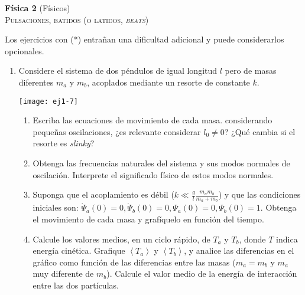 \documentclass[11pt,spanish,a4paper]{article}
\begin{document}
\begin{center}
\textbf{Física 2} (Físicos) \hfill {}\\
	\textsc{\LARGE Pulsaciones, batidos (o latidos, \emph{beats})}
\end{center}

Los ejercicios con (*) entrañan una dificultad adicional y puede considerarlos opcionales.


\begin{enumerate}


\item \label{pendacop}
\begin{minipage}[t][2.2cm]{0.75\textwidth}
Considere el sistema de dos péndulos de igual longitud $l$ pero de masas diferentes $m_{a}$ y $m_{b}$, acoplados mediante un resorte
de constante $k$.
\end{minipage}
\begin{minipage}[c][2cm][t]{0.2\textwidth}
  \texttt{[image: ej1-7]}
\end{minipage}
\begin{enumerate}
	\item Escriba las ecuaciones de movimiento de cada masa. considerando pequeñas oscilaciones, ¿es relevante considerar $l_0\neq0$? ¿Qué cambia si el resorte es \emph{slinky}?   
	\item Obtenga las frecuencias naturales del sistema y sus modos normales de oscilación.
Interprete el significado físico de estos modos normales. 
	\item Suponga que el acoplamiento es débil ($k\ll\frac{g}{l}\frac{m_{a}m_{b}}{m_{a}+m_{b}}$) y que las condiciones iniciales son: $\dot{\Psi}_{a}(0)=0,\dot{\Psi}_{b}(0)=0,\Psi_{a}(0)=0,\Psi_{b}(0)=1$.
Obtenga el movimiento de cada masa y grafíquelo en función del tiempo.
	\item Calcule los valores medios, en un ciclo rápido, de $T_{a}$ y $T_{b}$, donde $T$ indica energía cinética. Grafique $\left\langle T_{a}\right\rangle $ y $\left\langle T_{b}\right\rangle $, y analice las diferencias en el gráfico como función de las diferencias entre las masas ($m_{a}=m_{b}$ y $m_{a}$ muy diferente de $m_{b}$).
Calcule el valor medio de la energía de interacción entre las dos partículas.
\end{enumerate}




\end{enumerate}
\end{document}
